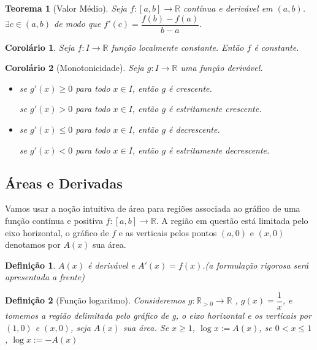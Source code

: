\documentclass[12pt]{article}
\newtheorem{theorem}{Teorema}[section]
\newtheorem{corollary}{Corolário}[theorem]
\newtheorem{definition}{Definição}
\begin{document}
\begin{theorem}[Valor Médio]
Seja $f: [a, b] \rightarrow{} \mathbb{R}$ contínua e derivável em $(a, b)$. $\exists c \in (a, b)$ de modo que $f'(c) = \dfrac{f(b) - f(a)}{b - a}$.
\end{theorem}

\begin{corollary}
    Seja $f: I \rightarrow{} \mathbb{R}$ função localmente constante. Então $f$ é constante.
\end{corollary}

\begin{corollary}[Monotonicidade]
    Seja $g: I \rightarrow{} \mathbb{R}$ uma função derivável.
    \begin{itemize}
        \item se $g'(x) \geq 0$ para todo $x \in I$, então $g$ é crescente.
        
        se $g'(x) > 0$ para todo $x \in I$, então $g$ é estritamente crescente.
        
        \item se $g'(x) \leq 0$ para todo $x \in I$, então $g$ é decrescente.
        
        se $g'(x) < 0$ para todo $x \in I$, então $g$ é estritamente decrescente.
    \end{itemize}
\end{corollary}

\subsection{Áreas e Derivadas}
\label{s5}

Vamos usar a noção intuitiva de área para regiões associada ao gráfico de uma função contínua e positiva $f: [a, b] \rightarrow{} \mathbb{R}$. A região em questão está limitada pelo eixo horizontal, o gráfico de $f$ e as verticais pelos pontos $(a, 0)$ e $(x, 0)$ denotamos por $A(x)$ sua área.

\begin{definition}
    $A(x)$ é derivável e $A'(x) = f(x)$.(a formulação rigorosa será apresentada a frente)
\end{definition}

\begin{definition}[Função logaritmo]
    Consideremos $g: \mathbb{R}_{>0} \rightarrow{} \mathbb{R}$ , $g(x) = \dfrac{1}{x}$, e tomemos a região delimitada pelo gráfico de g, o eixo horizontal e os verticais por $(1, 0)$ e $(x, 0)$, seja $A(x)$ sua área. Se $x \geq 1$, $\log x := A(x)$, se $0 < x \leq 1$, $\log x := -A(x)$
\end{definition}
\end{document}
